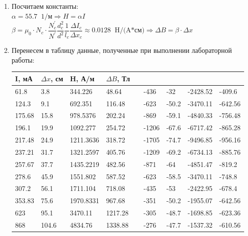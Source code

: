\documentclass[a4paper,12pt]{article}
\begin{document}
\begin{enumerate}
\itemsep0em
\item Посчитаем константы:\\
$\alpha = 55.7\;\;\text{1/м} \Rightarrow H = \alpha I$\\
$\beta = \mu_0 \cdot N_{c} \cdot \dfrac{N^{'}_{c}}{N^{'}} \dfrac{d_{c}^2}{d^2} \dfrac{1}{l_{c}}\dfrac{\Delta I_{c}}{\Delta x_{c}} \approx 0.0128\;\;\text{H/(A*см)} \Rightarrow \Delta B = \beta \cdot \Delta x$

\item Перенесем в таблицу данные, полученные при выполнении лабораторной работы:

\begin{table}[h!]
\centering
\begin{tabular}{|l|l|l|l||l||l|l|l|l|}
\hline 
I, мА  & $\Delta x$, см & H, А/м    & $\Delta B$, Тл &  &       &       &          &         \\
\hline 
61.8   & 3.8            & 344.226   & 48.64          &  & -436  & -32   & -2428.52 & -409.6  \\
124.3  & 9.1            & 692.351   & 116.48         &  & -623  & -50.2 & -3470.11 & -642.56 \\
175.68 & 15.8           & 978.5376  & 202.24         &  & -869  & -59.1 & -4840.33 & -756.48 \\
196.1  & 19.9           & 1092.277  & 254.72         &  & -1206 & -67.6 & -6717.42 & -865.28 \\
217.48 & 24.9           & 1211.3636 & 318.72         &  & -1705 & -74.7 & -9496.85 & -956.16 \\
237.21 & 31.7           & 1321.2597 & 405.76         &  & -1209 & -69.2 & -6734.13 & -885.76 \\
257.67 & 37.7           & 1435.2219 & 482.56         &  & -871  & -64   & -4851.47 & -819.2  \\
278.6  & 45.9           & 1551.802  & 587.52         &  & -623  & -58.5 & -3470.11 & -748.8  \\
307.2  & 56.1           & 1711.104  & 718.08         &  & -435  & -53   & -2422.95 & -678.4  \\
353.83 & 75.6           & 1970.8331 & 967.68         &  & -351  & -50.2 & -1955.07 & -642.56 \\
623    & 95.1           & 3470.11   & 1217.28        &  & -305  & -48.7 & -1698.85 & -623.36 \\
868    & 104.6          & 4834.76   & 1338.88        &  & -276  & -47.7 & -1537.32 & -610.56 \\

\end{tabular}
\end{table}
\end{enumerate}
\end{document}

